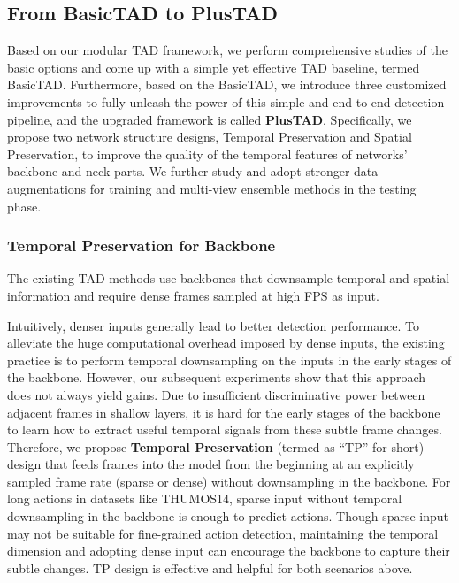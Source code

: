\documentclass[a4paper,fleqn]{cas-dc}
\begin{document}
\subsection{From BasicTAD to PlusTAD}
\label{frombasictadtobasictadplus}
Based on our modular TAD framework, we perform comprehensive studies of the basic options and come up with a simple yet effective TAD baseline, termed BasicTAD.
Furthermore, based on the BasicTAD, we introduce three customized improvements to fully unleash the power of this simple and end-to-end detection pipeline, and the upgraded framework is called \textbf{PlusTAD}.
Specifically, we propose two network structure designs, Temporal Preservation and Spatial Preservation, to improve the quality of the temporal features of networks' backbone and neck parts.
We further study and adopt stronger data augmentations for training and multi-view ensemble methods in the testing phase.

\subsubsection{Temporal Preservation for Backbone}
\label{temporalpreservationforbackbone}
The existing TAD methods use backbones that downsample temporal and spatial information and require dense frames sampled at high FPS as input.


Intuitively, denser inputs generally lead to better detection performance. To alleviate the huge computational overhead imposed by dense inputs, the existing practice is to perform temporal downsampling on the inputs in the early stages of the backbone. However, our subsequent experiments show that this approach does not always yield gains. 
Due to insufficient discriminative power between adjacent frames in shallow layers, it is hard for the early stages of the backbone to learn how to extract useful temporal signals from these subtle frame changes. Therefore, we propose \textbf{Temporal Preservation} (termed as ``TP'' for short) design that feeds frames into the model from the beginning at an explicitly sampled frame rate (sparse or dense) without downsampling in the backbone.
For long actions in datasets like THUMOS14, sparse input without temporal downsampling in the backbone is enough to predict actions. Though sparse input may not be suitable for fine-grained action detection, maintaining the temporal dimension and adopting dense input can encourage the backbone to capture their subtle changes. TP design is effective and helpful for both scenarios above.
\end{document}
